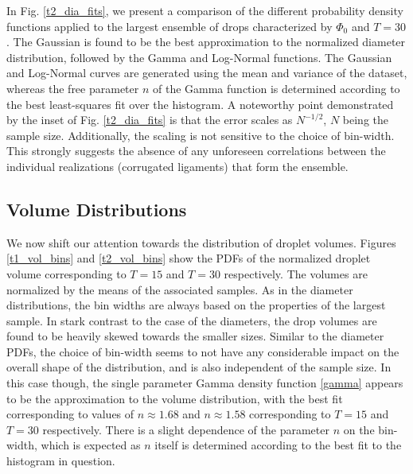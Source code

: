 
In Fig. \ref{t2_dia_fits}, we present a comparison of the different probability 
density functions applied to the largest ensemble of drops characterized by $\Phi_0$ and $T=30$. 
The Gaussian is found to be the best approximation to the normalized 
diameter distribution, followed by the Gamma and Log-Normal functions.
The Gaussian and Log-Normal curves are generated using the mean and variance 
of the dataset, whereas the free parameter $n$ of the Gamma function is determined
according to the best least-squares fit over the histogram. 
A noteworthy point demonstrated by the inset of Fig. \ref{t2_dia_fits} is that
the error  scales as $N^{-1/2}$, $N$ being the sample size.
Additionally, the scaling is not sensitive to the choice of bin-width. 
This strongly suggests the absence of any unforeseen correlations between the 
individual realizations (corrugated ligaments) that form the ensemble.


\subsection*{Volume Distributions}

We now shift our attention towards the distribution of droplet volumes. 
Figures \ref{t1_vol_bins} and \ref{t2_vol_bins} show the PDFs 
of the normalized droplet volume corresponding to $T=15$ and $T=30$ respectively. 
The volumes are normalized by the means of the associated samples. 
As in the diameter distributions, the bin widths are always 
based on the properties of the largest sample.
In stark contrast to the case of the diameters, the drop volumes
are found to be heavily skewed towards the smaller sizes.
Similar to the diameter PDFs, the choice of bin-width seems to not have any considerable impact
on the overall shape of the distribution, and is also independent of the sample size.   
In this case though, the single parameter Gamma density function \eqref{gamma} appears to
be the approximation to the volume distribution, with the best fit corresponding to 
values of $n \approx 1.68$ and $n \approx 1.58$ corresponding to $T=15$ and $T=30$ respectively.
There is a slight dependence of the parameter $n$ on the bin-width, which is expected 
as $n$ itself is determined according to the best fit to the histogram in question.

